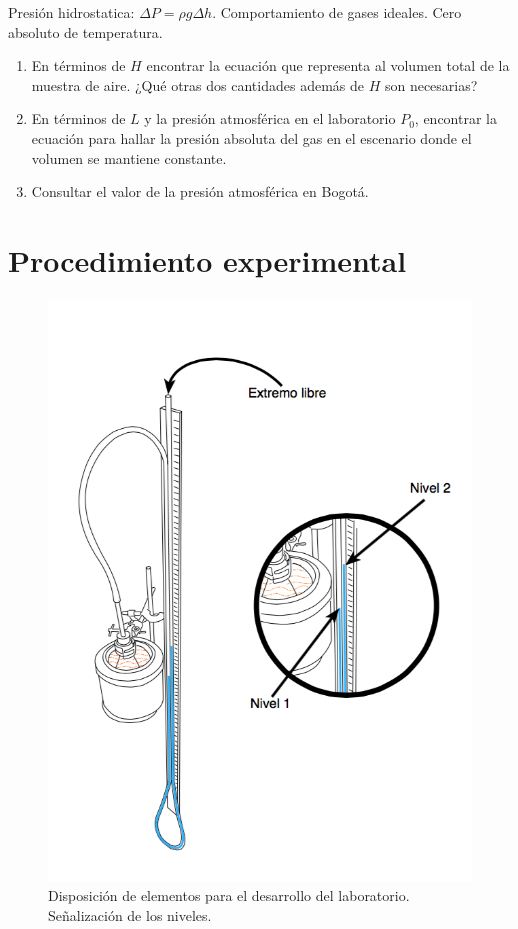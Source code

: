 \documentclass[DIV=calc, paper=a4, fontsize=11pt, twocolumn, spanish]{scrartcl}	 %
\begin{document}
Presión hidrostatica: $\Delta P = \rho g \Delta h$. Comportamiento de gases ideales. Cero absoluto de temperatura.\\

\begin{enumerate}
\item En términos de $H$ encontrar la ecuación que representa al volumen total de la muestra de aire. ¿Qué otras dos cantidades además de $H$ son necesarias?

\vspace{40 mm}

\item En términos de $L$ y la presión atmosférica en el laboratorio $P_0$, encontrar la ecuación para hallar la presión absoluta del gas en el escenario donde el volumen se mantiene constante.

\vspace{40 mm}

\item 
Consultar el valor de la presión atmosférica en Bogotá.
\end{enumerate}

\section*{Procedimiento experimental}

\begin{figure}[htbp]
\centering
	\includegraphics[scale=0.5]{data/img/disp}
	\caption{Disposición de elementos para el desarrollo del laboratorio. Señalización de los niveles.}
\end{figure}
\end{document}
